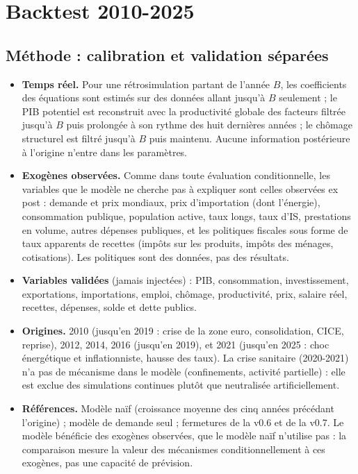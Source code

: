 \chapter{Backtest 2010-2025}\label{ch:backtest}

\section{Méthode : calibration et validation séparées}

\begin{itemize}
\item \textbf{Temps réel.} Pour une rétrosimulation partant de l'année $B$, les coefficients des équations sont estimés
sur des données allant jusqu'à $B$ seulement ; le PIB potentiel est reconstruit avec la productivité globale des
facteurs filtrée jusqu'à $B$ puis prolongée à son rythme des huit dernières années ; le chômage structurel est filtré
jusqu'à $B$ puis maintenu. Aucune information postérieure à l'origine n'entre dans les paramètres.
\item \textbf{Exogènes observées.} Comme dans toute évaluation conditionnelle, les variables que le modèle ne cherche pas
à expliquer sont celles observées ex post : demande et prix mondiaux, prix d'importation (dont l'énergie), consommation
publique, population active, taux longs, taux d'IS, prestations en volume, autres dépenses publiques, et les politiques
fiscales sous forme de taux apparents de recettes (impôts sur les produits, impôts des ménages, cotisations). Les
politiques sont des données, pas des résultats.
\item \textbf{Variables validées} (jamais injectées) : PIB, consommation, investissement, exportations, importations,
emploi, chômage, productivité, prix, salaire réel, recettes, dépenses, solde et dette publics.
\item \textbf{Origines.} 2010 (jusqu'en 2019 : crise de la zone euro, consolidation, CICE, reprise), 2012, 2014, 2016
(jusqu'en 2019), et 2021 (jusqu'en 2025 : choc énergétique et inflationniste, hausse des taux). La crise sanitaire
(2020-2021) n'a pas de mécanisme dans le modèle (confinements, activité partielle) : elle est exclue des simulations
continues plutôt que neutralisée artificiellement.
\item \textbf{Références.} Modèle naïf (croissance moyenne des cinq années précédant l'origine) ; modèle de demande
seul ; fermetures de la v0.6 et de la v0.7. Le modèle bénéficie des exogènes observées, que le modèle naïf n'utilise
pas : la comparaison mesure la valeur des mécanismes conditionnellement à ces exogènes, pas une capacité de
prévision.
\end{itemize}

